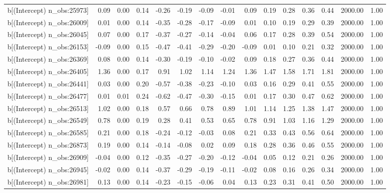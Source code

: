 \begin{table}[ht]
\begin{tabular}{rrrrrrrrrrrrrrr}
  b[(Intercept) n\_obs:25973] & 0.09 & 0.00 & 0.14 & -0.26 & -0.19 & -0.09 & -0.01 & 0.09 & 0.19 & 0.28 & 0.36 & 0.44 & 2000.00 & 1.00 \\ 
  b[(Intercept) n\_obs:26009] & 0.01 & 0.00 & 0.14 & -0.35 & -0.28 & -0.17 & -0.09 & 0.01 & 0.10 & 0.19 & 0.29 & 0.39 & 2000.00 & 1.00 \\ 
  b[(Intercept) n\_obs:26045] & 0.07 & 0.00 & 0.17 & -0.37 & -0.27 & -0.14 & -0.04 & 0.06 & 0.17 & 0.28 & 0.39 & 0.54 & 2000.00 & 1.00 \\ 
  b[(Intercept) n\_obs:26153] & -0.09 & 0.00 & 0.15 & -0.47 & -0.41 & -0.29 & -0.20 & -0.09 & 0.01 & 0.10 & 0.21 & 0.32 & 2000.00 & 1.00 \\ 
  b[(Intercept) n\_obs:26369] & 0.08 & 0.00 & 0.14 & -0.30 & -0.19 & -0.10 & -0.02 & 0.09 & 0.18 & 0.27 & 0.36 & 0.44 & 2000.00 & 1.00 \\ 
  b[(Intercept) n\_obs:26405] & 1.36 & 0.00 & 0.17 & 0.91 & 1.02 & 1.14 & 1.24 & 1.36 & 1.47 & 1.58 & 1.71 & 1.81 & 2000.00 & 1.00 \\ 
  b[(Intercept) n\_obs:26441] & 0.03 & 0.00 & 0.20 & -0.57 & -0.38 & -0.23 & -0.10 & 0.03 & 0.16 & 0.29 & 0.41 & 0.55 & 2000.00 & 1.00 \\ 
  b[(Intercept) n\_obs:26477] & 0.01 & 0.01 & 0.24 & -0.62 & -0.47 & -0.30 & -0.15 & 0.01 & 0.17 & 0.30 & 0.47 & 0.62 & 2000.00 & 1.00 \\ 
  b[(Intercept) n\_obs:26513] & 1.02 & 0.00 & 0.18 & 0.57 & 0.66 & 0.78 & 0.89 & 1.01 & 1.14 & 1.25 & 1.38 & 1.47 & 2000.00 & 1.00 \\ 
  b[(Intercept) n\_obs:26549] & 0.78 & 0.00 & 0.19 & 0.28 & 0.41 & 0.53 & 0.65 & 0.78 & 0.91 & 1.03 & 1.16 & 1.29 & 2000.00 & 1.00 \\ 
  b[(Intercept) n\_obs:26585] & 0.21 & 0.00 & 0.18 & -0.24 & -0.12 & -0.03 & 0.08 & 0.21 & 0.33 & 0.43 & 0.56 & 0.64 & 2000.00 & 1.00 \\ 
  b[(Intercept) n\_obs:26873] & 0.19 & 0.00 & 0.14 & -0.14 & -0.08 & 0.02 & 0.09 & 0.18 & 0.28 & 0.36 & 0.46 & 0.55 & 2000.00 & 1.00 \\ 
  b[(Intercept) n\_obs:26909] & -0.04 & 0.00 & 0.12 & -0.35 & -0.27 & -0.20 & -0.12 & -0.04 & 0.05 & 0.12 & 0.21 & 0.26 & 2000.00 & 1.00 \\ 
  b[(Intercept) n\_obs:26945] & -0.02 & 0.00 & 0.14 & -0.37 & -0.29 & -0.19 & -0.11 & -0.02 & 0.08 & 0.16 & 0.26 & 0.34 & 2000.00 & 1.00 \\ 
  b[(Intercept) n\_obs:26981] & 0.13 & 0.00 & 0.14 & -0.23 & -0.15 & -0.06 & 0.04 & 0.13 & 0.23 & 0.31 & 0.41 & 0.50 & 2000.00 & 1.00 \\ 

\end{tabular}
\end{table}
